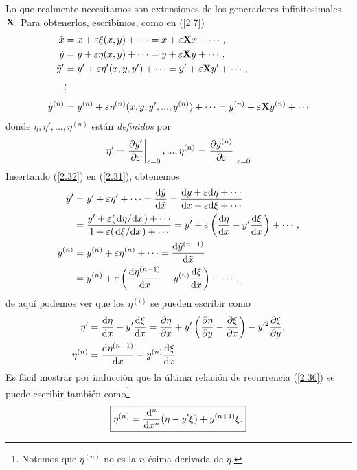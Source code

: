 Lo que realmente necesitamos son extensiones de los generadores infinitesimales $\vb{X}$. Para obtenerlos, escribimos, como en (\ref{2.7})
\begin{align}\label{2.32}
    \begin{split}
        \Tilde{x}&=x+\varepsilon\xi(x,y)+\cdots=x+\varepsilon\vb{X}x+\cdots,\\
        \Tilde{y}&=y+\varepsilon \eta(x,y)+\cdots=y+\varepsilon\vb{X}y+\cdots,\\
        \Tilde{y}'&=y'+\varepsilon\eta'(x,y,y')+\cdots=y'+\varepsilon\vb{X}y'+\cdots,\\
        &\vdots\\
        \Tilde{y}^{(n)}&=y^{(n)}+\varepsilon\eta^{(n)}(x,y,y',...,y^{(n)})+\cdots=y^{(n)}+\varepsilon\vb{X}y^{(n)}+\cdots
    \end{split}
\end{align}
donde $\eta,\eta',...,\eta^{(n)}$ están \textit{definidos} por
\begin{equation}
    \eta'=\eval{\pdv{\Tilde{y}'}{\varepsilon}}_{\varepsilon=0},...,  \eta^{(n)}=\eval{\pdv{\Tilde{y}^{(n)}}{\varepsilon}}_{\varepsilon=0}
\end{equation}
Insertando (\ref{2.32}) en (\ref{2.31}), obtenemos
\begin{align}
    \begin{split}
        \Tilde{y}'&=y'+\varepsilon\eta'+\cdots=\dv{\Tilde{y}}{\Tilde{x}}=\frac{\dd y+\varepsilon\dd\eta+\cdots}{\dd x+\varepsilon\dd\xi+\cdots}\\
        &=\frac{y'+\varepsilon(\dv*{\eta}{x})+\cdots}{1+\varepsilon(\dv*{\xi}{x})+\cdots}=y'+\varepsilon\left(\dv{\eta}{x}-y'\dv{\xi}{x}\right)+\cdots,\\
        \Tilde{y}^{(n)}&=y^{(n)}+\varepsilon\eta^{(n)}+\cdots=\dv{\Tilde{y}^{(n-1)}}{\Tilde{x}}\\
        &=y^{(n)}+\varepsilon\left(\dv{\eta^{(n-1)}}{x}-y^{(n)}\dv{\xi}{x}\right)+\cdots,
    \end{split}
\end{align}
de aquí podemos ver que los $\eta^{(i)}$ se pueden escribir como
\begin{align}
    \eta'&=\dv{\eta}{x}-y'\dv{\xi}{x}=\pdv{\eta}{x}+y'\left(\pdv{\eta}{y}-\pdv{\xi}{x}\right)-y'^2\pdv{\xi}{y},\\
    \eta^{(n)}&=\dv{\eta^{(n-1)}}{x}-y^{(n)}\dv{\xi}{x}\label{2.36}
\end{align}
Es fácil mostrar por inducción que la última relación de recurrencia (\ref{2.36}) se puede escribir también como\footnote{Notemos que $\eta^{(n)}$ no es la $n$-ésima derivada de $\eta$.}
\begin{equation}\label{2.37}
    \boxed{\eta^{(n)}=\dv[n]{x}(\eta-y'\xi)+y^{(n+1)}\xi.}
\end{equation}

